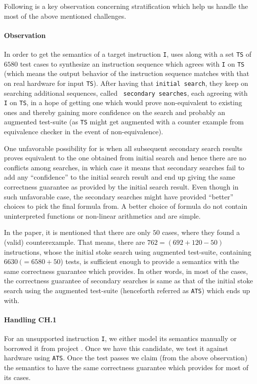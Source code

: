Following is a key observation concerning stratification which help us handle
the most of the above mentioned challenges.

\paragraph{Observation} In order to get the semantics of a target instruction
{\tt I}, \Strata uses \Stoke along with a set {\tt TS} of $6580$ test cases to
synthesize an instruction sequence which agrees with {\tt I} on {\tt TS} (which
    means the output behavior of the instruction sequence matches with that on real
    hardware for input {\tt TS}). After having that {\tt initial
  search}, they keep on searching  additional sequences, called {\tt
      secondary searches}, each agreeing with {\tt I} on {\tt TS}, in a hope of
  getting  one which would prove non-equivalent to existing ones and thereby
  gaining more confidence on the search and probably an augmented test-suite (as
      {\tt TS} might get augmented with a counter example from equivalence
      checker in the event of non-equivalence). 
      
      One unfavorable possibility for
  \Strata is when all subsequent secondary search results proves  equivalent to
  the one obtained from initial search and hence there are no conflicts among searches, in which case it  means that  secondary
  searches fail to add any ``confidence'' to the initial search result and end up giving the same correctness guarantee as provided by the initial search result. Even though in such unfavorable case, the secondary searches might have
    provided ``better'' choices to pick the final formula from. A better choice
    of formula do not contain uninterpreted functions or  non-linear arithmetics
    and are simple.  
    
   In the paper\cite{Heule2016a}, it is mentioned that there are only $50$
   cases, where they found a (valid) counterexample. That means, there are $762
   = (692 + 120 - 50)$ instructions, whose the initial stoke search using augmented test-suite, containing $6630\ (= 6580 + 50$) tests,  is sufficient enough to provide a semantics with the same correctness guarantee which \Strata provides.   In other words, in  most of
   the cases, the correctness guarantee of secondary searches is same as that of the initial stoke search using the augmented test-suite (henceforth referred as {\tt ATS})  which \Strata ends up with.
      
      
    \paragraph{Handling CH.1}
   For an unsupported instruction {\tt I}, we either model its semantics  manually or borrowed it from project \Stoke.   
   Once we have this candidate, we test it against hardware using {\tt ATS}.
   Once the test passes we claim (from the above observation) the
   semantics to have the same correctness guarantee which \Strata provides for 
   most of its cases.    
    
